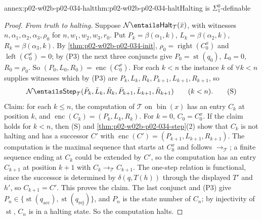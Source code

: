 \begin{annexitem}{annex:p02-w02b-p02-034-halt}{thm:p02-w02b-p02-034-halt}{Halting is \(\Sigma^0_1\)-definable}
\begin{proof}
\emph{From truth to halting.}  Suppose
\(\mathcal N\entails\mathsf{Halt}_{\mathcal T}(\bar x)\), with witnesses
\(n,\alpha_1,\alpha_2,\alpha_3,\rho_0\) for \(n,w_1,w_2,w_3,r_0\).  Put
\(P_k=\beta(\alpha_1,k)\), \(L_k=\beta(\alpha_2,k)\), \(R_k=\beta(\alpha_3,k)\).
By \cref{thm:p02-w02b-p02-034-init}, \(\rho_0=\operatorname{right}(C^x_0)\)
and \(\operatorname{left}(C^x_0)=0\); by (P3) the next three conjuncts give
\(P_0=\operatorname{st}(q_0)\), \(L_0=0\), \(R_0=\rho_0\).  So
\((P_0,L_0,R_0)=\operatorname{enc}(C^x_0)\).  For each \(k<n\) the instance
\(k\) of \(\forall k<n\) supplies witnesses which by (P3) are
\(P_k,L_k,R_k,P_{k+1},L_{k+1},R_{k+1}\), so
\[
 \mathcal N\entails\mathsf{Step}_{\mathcal T}(\bar P_k,\bar L_k,\bar R_k,\bar P_{k+1},\bar L_{k+1},\bar R_{k+1})
 \qquad(k<n).
 \tag{S}
\]
Claim: for each \(k\le n\), the computation of \(\mathcal T\) on
\(\operatorname{bin}(x)\) has an entry \(C_k\) at position \(k\), and
\(\operatorname{enc}(C_k)=(P_k,L_k,R_k)\).  For \(k=0\), \(C_0=C^x_0\).  If
the claim holds for \(k<n\), then (S) and
\cref{thm:p02-w02b-p02-034-step}(2) show that \(C_k\) is not halting and has
a successor \(C'\) with \(\operatorname{enc}(C')=(P_{k+1},L_{k+1},R_{k+1})\).
The computation is the maximal sequence that starts at \(C^x_0\) and follows
\(\longrightarrow_{\mathcal T}\); a finite sequence ending at \(C_k\) could
be extended by \(C'\), so the computation has an entry \(C_{k+1}\) at
position \(k+1\) with \(C_k\longrightarrow_{\mathcal T}C_{k+1}\).  The
one-step relation is functional, since the successor is determined by
\(\delta(q,T(h))\) through the displayed \(T'\) and \(h'\), so \(C_{k+1}=C'\).
This proves the claim.  The last conjunct and (P3) give
\(P_n\in\{\operatorname{st}(q_{\mathrm{acc}}),\operatorname{st}(q_{\mathrm{rej}})\}\),
and \(P_n\) is the state number of \(C_n\); by injectivity of
\(\operatorname{st}\), \(C_n\) is in a halting state.  So the computation
halts.


\end{proof}
\end{annexitem}
